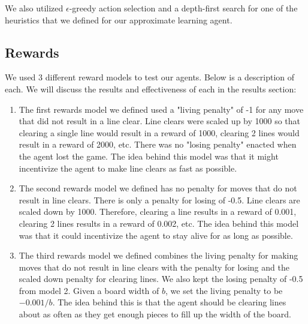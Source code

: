 \documentclass[11pt]{article}
\begin{document}
\bigskip

We also utilized $\epsilon$-greedy action selection and a depth-first search for one of the heuristics that we defined for our approximate learning agent.

\subsection{Rewards}
We used 3 different reward models to test our agents. Below is a description of each. We will discuss the results and effectiveness of each in the results section:
\begin{enumerate}
    \item The first rewards model we defined used a "living penalty" of -1 for any move that did not result in a line clear. Line clears were scaled up by 1000 so that clearing a single line would result in a reward of 1000, clearing 2 lines would result in a reward of 2000, etc. There was no "losing penalty" enacted when the agent lost the game. The idea behind this model was that it might incentivize the agent to make line clears as fast as possible.
    \item The second rewards model we defined has no penalty for moves that do not result in line clears. There is only a penalty for losing of -0.5. Line clears are scaled down by 1000. Therefore, clearing a line results in a reward of 0.001, clearing 2 lines results in a reward of 0.002, etc. The idea behind this model was that it could incentivize the agent to stay alive for as long as possible.
    \item The third rewards model we defined combines the living penalty for making moves that do not result in line clears with the penalty for losing and the scaled down penalty for clearing lines. We also kept the losing penalty of -0.5 from model 2. Given a board width of $b$, we set the living penalty to be $-0.001/b$. The idea behind this is that the agent should be clearing lines about as often as they get enough pieces to fill up the width of the board.
\end{enumerate}
\end{document}
